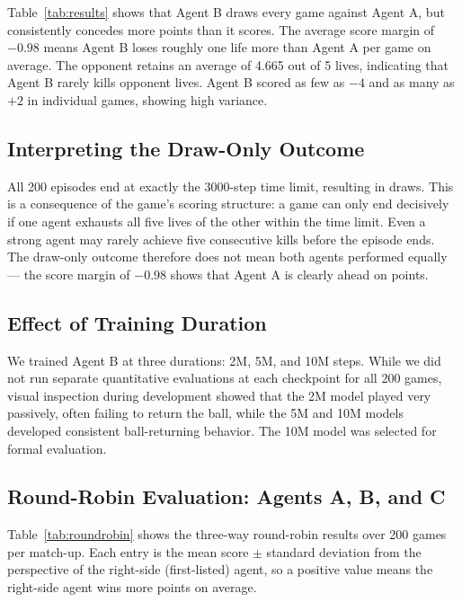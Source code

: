 \documentclass[conference]{IEEEtran}
\begin{document}
Table~\ref{tab:results} shows that Agent B draws every game against Agent A, but consistently concedes more points than it scores. The average score margin of $-0.98$ means Agent B loses roughly one life more than Agent A per game on average. The opponent retains an average of 4.665 out of 5 lives, indicating that Agent B rarely kills opponent lives. Agent B scored as few as $-4$ and as many as $+2$ in individual games, showing high variance.

\subsection{Interpreting the Draw-Only Outcome}

All 200 episodes end at exactly the 3000-step time limit, resulting in draws. This is a consequence of the game's scoring structure: a game can only end decisively if one agent exhausts all five lives of the other within the time limit. Even a strong agent may rarely achieve five consecutive kills before the episode ends. The draw-only outcome therefore does not mean both agents performed equally --- the score margin of $-0.98$ shows that Agent A is clearly ahead on points.

\subsection{Effect of Training Duration}

We trained Agent B at three durations: 2M, 5M, and 10M steps. While we did not run separate quantitative evaluations at each checkpoint for all 200 games, visual inspection during development showed that the 2M model played very passively, often failing to return the ball, while the 5M and 10M models developed consistent ball-returning behavior. The 10M model was selected for formal evaluation.

\subsection{Round-Robin Evaluation: Agents A, B, and C}

Table~\ref{tab:roundrobin} shows the three-way round-robin results over 200 games per match-up. Each entry is the mean score $\pm$ standard deviation from the perspective of the right-side (first-listed) agent, so a positive value means the right-side agent wins more points on average.
\end{document}
